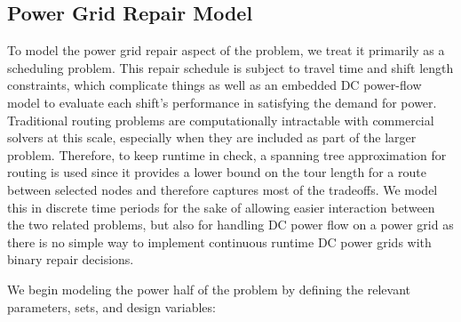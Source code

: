 \documentclass[10pt]{article}
\begin{document}
\subsection{Power Grid Repair Model}
\vspace*{-12pt}
To model the power grid repair aspect of the problem, we treat it primarily as a scheduling problem. This repair schedule is subject to travel time and shift length constraints, which complicate things as well as an embedded DC power-flow model to evaluate each shift's performance in satisfying the demand for power. Traditional routing problems are computationally intractable with commercial solvers at this scale, especially when they are included as part of the larger problem. Therefore, to keep runtime in check, a spanning tree approximation for routing is used since it provides a lower bound on the tour length for a route between selected nodes and therefore captures most of the tradeoffs. We model this in discrete time periods for the sake of allowing easier interaction between the two related problems, but also for handling DC power flow on a power grid as there is no simple way to implement continuous runtime DC power grids with binary repair decisions.

We begin modeling the power half of the problem by defining the relevant parameters, sets, and design variables:
\end{document}
